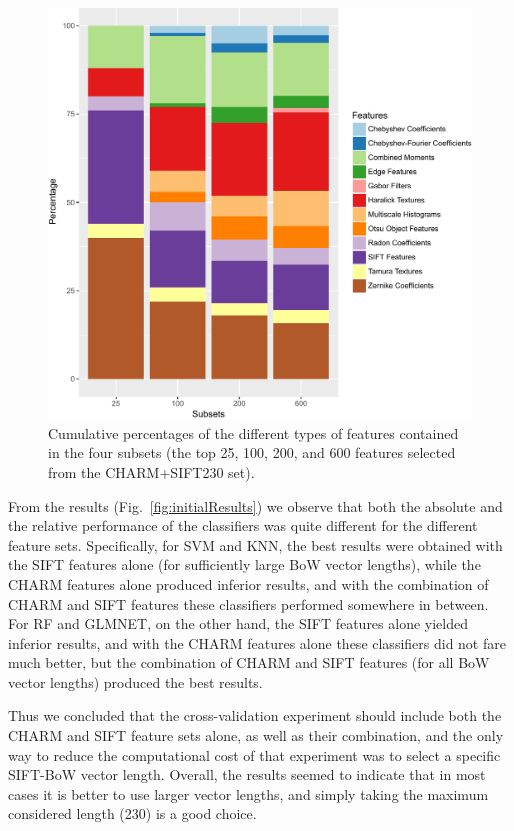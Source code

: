 \begin{figure}[!t]
	\centering
	\includegraphics[width=\columnwidth]{fig07}
	\caption{\color{red}Cumulative percentages of the different types of features contained in the four subsets (the top 25, 100, 200, and 600 features selected from the CHARM+SIFT230 set).}
	\label{fig:subsetFS}
\end{figure}

From the results (Fig.~\ref{fig:initialResults}) we observe that both the absolute and the relative performance of the classifiers was quite different for the different feature sets. Specifically, for SVM and KNN, the best results were obtained with the SIFT features alone (for sufficiently large BoW vector lengths), while the CHARM features alone produced inferior results, and with the combination of CHARM and SIFT features these classifiers performed somewhere in between. For RF and GLMNET, on the other hand, the SIFT features alone yielded inferior results, and with the CHARM features alone these classifiers did not fare much better, but the combination of CHARM and SIFT features (for all BoW vector lengths) produced the best results.

Thus we concluded that the cross-validation experiment should include both the CHARM and SIFT feature sets alone, as well as their combination, and the only way to reduce the computational cost of that experiment was to select a specific SIFT-BoW vector length. Overall, the results seemed to indicate that in most cases it is better to use larger vector lengths, and simply taking the maximum considered length (230) is a good choice.

